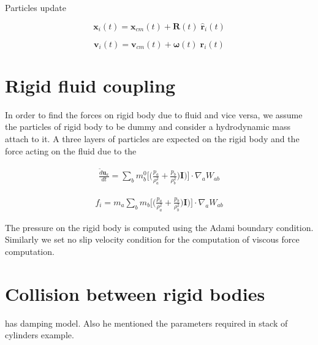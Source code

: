\documentclass[preprint,12pt]{elsarticle}
\newcommand{\todoin}{\todo[inline]}
\newcommand{\teng}[1]{\ensuremath{\boldsymbol{#1}}}
\newcommand{\ten}[1]{\ensuremath{\mathbf{#1}}}
\begin{document}
Particles update


\begin{equation}
  \label{eq:rb_particle_pos_update}
  \ten{x}_i(t) = \ten{x}_{cm}(t) + \ten{R}(t) \; \hat{\ten{r}}_{i}(t)
\end{equation}


\begin{equation}
  \label{eq:rb_particle_vel_update}
  \ten{v}_i(t) = \ten{v}_{cm}(t) + \teng{\omega}(t) \; \ten{r}_{i}(t)
\end{equation}


\FloatBarrier%
\section{Rigid fluid coupling}
\label{sec:rfc}

In order to find the forces on rigid body due to fluid and vice versa, we
assume the particles of rigid body to be dummy and consider a hydrodynamic
mass attach to it. A three layers of particles are expected on the rigid body
and the force acting on the fluid due to the

\begin{multline}
  \label{eq:force_on_fluid_due_to_rb}
  \frac{\tilde{d}\ten{u}_{a}}{dt} =  \sum_{b} m^0_b \bigg[
  \bigg(\frac{p_a}{\rho_a^2} + \frac{p_b}{\rho_b^2}\bigg) \ten{I}\bigg) \bigg]
  \cdot \nabla_{a} W_{ab}
\end{multline}

\begin{multline}
  \label{eq:force_on_fluid_due_to_rb}
  f_i =  m_a \sum_{b} m_b \bigg[
  \bigg(\frac{p_a}{\rho_a^2} + \frac{p_b}{\rho_b^2}\bigg) \ten{I}\bigg) \bigg]
  \cdot \nabla_{a} W_{ab}
\end{multline}


The pressure on the rigid body is computed using the Adami boundary condition.
Similarly we set no slip velocity condition for the computation of viscous
force computation.


\FloatBarrier%
\section{Collision between rigid bodies}
\label{sec:contact-force}

\citet{chen2019coupled} has damping model. Also he mentioned the parameters
required in stack of cylinders example.


\end{document}

